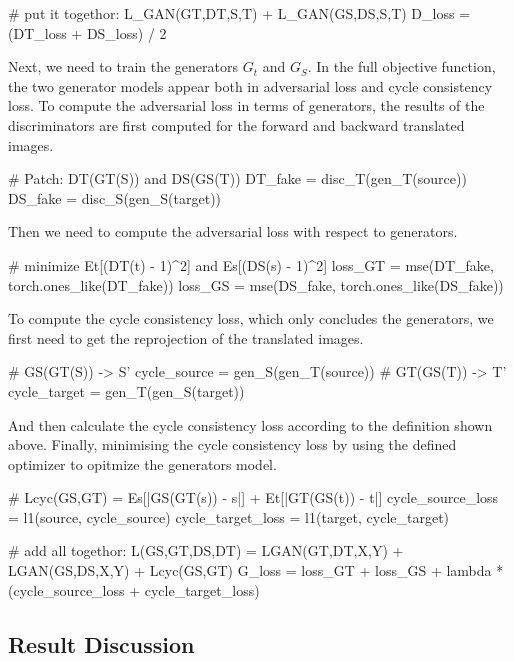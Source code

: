 \begin{python}
# put it togethor: L_GAN(GT,DT,S,T) + L_GAN(GS,DS,S,T) 
D_loss = (DT_loss + DS_loss) / 2
\end{python}

Next, we need to train the generators $G_t$ and $G_S$. In the full objective function, the two generator models appear both in adversarial loss and cycle consistency loss. To compute the adversarial loss in terms of generators, the results of the discriminators are first computed for the forward and backward translated images.

\begin{python}
# Patch: DT(GT(S)) and DS(GS(T)) 
DT_fake = disc_T(gen_T(source))
DS_fake = disc_S(gen_S(target))
\end{python}

Then we need to compute the adversarial loss with respect to generators.

\begin{python}
# minimize Et[(DT(t) - 1)^2] and Es[(DS(s) - 1)^2]
loss_GT = mse(DT_fake, torch.ones_like(DT_fake))
loss_GS = mse(DS_fake, torch.ones_like(DS_fake))
\end{python}

To compute the cycle consistency loss, which only concludes the generators, we first need to get the reprojection of the translated images.

\begin{python}
# GS(GT(S)) -> S'
cycle_source = gen_S(gen_T(source))
# GT(GS(T)) -> T'
cycle_target = gen_T(gen_S(target))
\end{python}

And then calculate the cycle consistency loss according to the definition shown above. Finally, minimising the cycle consistency loss by using the defined optimizer to opitmize the generators model.

\begin{python}
# Lcyc(GS,GT) = Es[|GS(GT(s)) - s|] + Et[|GT(GS(t)) - t|]
cycle_source_loss = l1(source, cycle_source)
cycle_target_loss = l1(target, cycle_target)

# add all togethor: L(GS,GT,DS,DT) = LGAN(GT,DT,X,Y) + LGAN(GS,DS,X,Y) + Lcyc(GS,GT)
G_loss = loss_GT + loss_GS +  
         lambda * (cycle_source_loss + cycle_target_loss) 
\end{python}

\subsection{Result Discussion}

